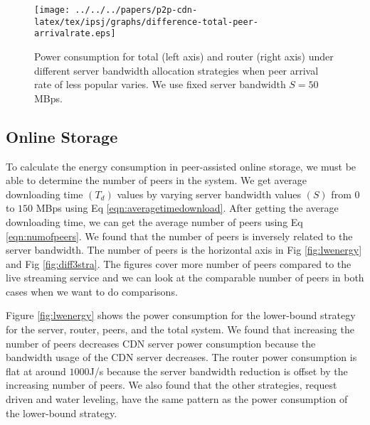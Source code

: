 \begin{figure}[tb]
\begin{center}
\texttt{[image: ../../../papers/p2p-cdn-latex/tex/ipsj/graphs/difference-total-peer-arrivalrate.eps]}
\end{center}
\caption{Power consumption for total (left axis) and router (right axis) under different server bandwidth allocation strategies when peer arrival rate of less popular varies. We use fixed server bandwidth $S=50$ MBps.}
\label{fig:diffarrivalrate}
\vspace{-2mm}
\end{figure} 


\subsection{Online Storage}

To calculate the energy consumption in peer-assisted online storage, we must be able to determine the number of peers in the system. 
We get average downloading time $(T_d)$  values by varying server bandwidth values $(S)$ from $0$ to $150$ MBps using Eq \ref{eqn:averagetimedownload}. 
After getting the average downloading time, we can get the average number of peers using Eq \ref{eqn:numofpeers}. 
We found that the number of peers is inversely related to the server bandwidth.  
The number of peers is the horizontal axis in Fig \ref{fig:lwenergy} and Fig \ref{fig:diff3stra}. 
The figures cover more number of peers compared to the live streaming service and we can look at the comparable number of peers in both cases when we want to do comparisons.

Figure \ref{fig:lwenergy} shows the power consumption for the lower-bound strategy for the server, router, peers, and the total system. 
We found that increasing the number of peers decreases CDN server power consumption because the bandwidth usage of the CDN server decreases. 
The router power consumption is flat at around $1000$J/s because the server bandwidth reduction is offset by the increasing number of peers. 
We also found that the other strategies, request driven and water leveling, have the same pattern as the power consumption of the lower-bound strategy.

